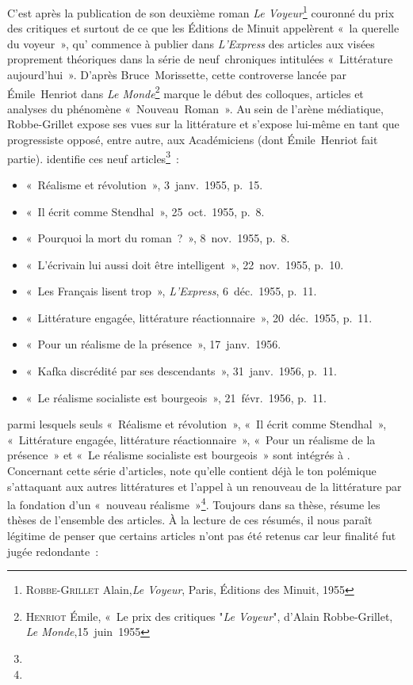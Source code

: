 C'est après la publication de son deuxième roman \textit{Le Voyeur}\footnote{\textsc{Robbe-Grillet} Alain,\textit{Le Voyeur}, Paris, Éditions des Minuit, 1955} couronné du prix des critiques et surtout de ce que les Éditions de Minuit appelèrent «~la querelle du voyeur~», qu'\robbe{} commence à publier dans \textit{L'Express} des articles aux visées proprement théoriques dans la série de neuf~chroniques intitulées «~Littérature aujourd'hui~». D'après Bruce~Morissette, cette controverse lancée par Émile~Henriot dans \textit{Le Monde}\footnote{\textsc{Henriot} Émile, «~Le prix des critiques "\textit{Le Voyeur}", d'Alain Robbe-Grillet, \textit{Le Monde},15~juin~1955} marque le début des colloques, articles et analyses du phénomène «~Nouveau~Roman~». Au sein de l'arène médiatique, Robbe-Grillet expose ses vues sur la littérature et s'expose lui-même en tant que progressiste opposé, entre autre, aux Académiciens (dont Émile~Henriot fait partie). \galia{} identifie ces neuf articles\footnote{}~:
\begin{itemize}
    \item «~Réalisme et révolution~», 3~janv.~1955, p.~15.
    \item «~Il écrit comme Stendhal~», 25~oct.~1955, p.~8.
    \item «~Pourquoi la mort du roman~?~», 8~nov.~1955, p.~8.
    \item «~L’écrivain lui aussi doit être intelligent~», 22~nov.~1955, p.~10.
    \item «~Les Français lisent trop~», \textit{L’Express}, 6~déc.~1955, p.~11.
    \item «~Littérature engagée, littérature réactionnaire~», 20~déc.~1955, p.~11.
    \item «~Pour un réalisme de la présence~», 17~janv.~1956.
    \item «~Kafka discrédité par ses descendants~», 31~janv.~1956, p.~11.
    \item «~Le réalisme socialiste est bourgeois~», 21~févr.~1956, p.~11.
\end{itemize}
parmi lesquels seuls «~Réalisme et révolution~», «~Il écrit comme Stendhal~», «~Littérature engagée, littérature réactionnaire~», «~Pour un réalisme de la présence~» et «~Le réalisme socialiste est bourgeois~» sont intégrés à \punr. Concernant cette série d'articles, \galia{} note qu'elle contient déjà le ton polémique s'attaquant aux autres littératures et l'appel à un renouveau de la littérature par la fondation d'un «~nouveau réalisme~»\footnote{}. Toujours dans sa thèse, \galia{} résume les thèses de l'ensemble des articles. À la lecture de ces résumés, il nous paraît légitime de penser que certains articles n'ont pas été retenus car leur finalité fut jugée redondante~:
